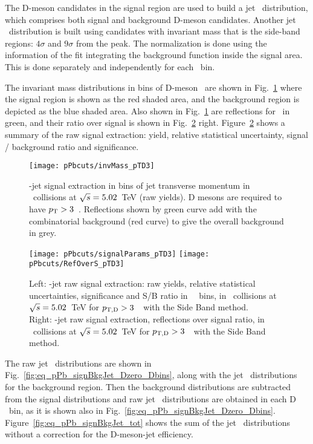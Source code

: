 The D-meson candidates in the signal region are used to build a jet \pt\ distribution, which comprises both signal and background D-meson candidates.
Another jet \pt\ distribution is built using candidates with invariant mass that is the side-band regions: $4\sigma$ and $9\sigma$ from the peak.
The normalization is done using the information of the fit integrating the background function inside the signal area. This is done separately and independently for each \ptd\ bin.


The invariant mass distributions in bins of D-meson \pt\ are shown in Fig.~\ref{fig:eq_pPb_InvMass_Dzero_Dbins} where  the signal region is shown as the red shaded area, and the background region is depicted as the blue shaded area.
Also shown in Fig.~\ref{fig:eq_pPb_InvMass_Dzero_Dbins} are reflections for \Dzero\ in green, and their ratio over signal is shown in Fig.~\ref{fig:eq_pPb_RSU_raw_Dbins_Dzero} right.
Figure~\ref{fig:eq_pPb_RSU_raw_Dbins_Dzero} shows a summary of the raw signal extraction:
yield, relative statistical uncertainty, signal / background ratio and significance.

\begin{figure}[bth]
\centering
\texttt{[image: pPbcuts/invMass\_pTD3]}
\caption{\Dzero-jet signal extraction in bins of jet transverse momentum in \pp\ collisions at $\sqrt{s}=5.02$~TeV (raw yields). D mesons are required to have $p_{\rm T}>3$~\GeVc. 
Reflections shown by green curve add with the combinatorial background (red curve) to give the overall background in grey.
}
\label{fig:eq_pPb_InvMass_Dzero_Dbins}
\end{figure}

\begin{figure}[bth]
\centering
\texttt{[image: pPbcuts/signalParams\_pTD3]}
\texttt{[image: pPbcuts/RefOverS\_pTD3]}
\caption{Left: \Dzero-jet raw signal extraction: raw yields, relative statistical uncertainties, significance and S/B ratio in \Dzero\ \pt\ bins, in \pp\ collisions at $\sqrt{s}=5.02$~TeV for $p_{\mathrm{T,D}}>3$~\GeVc\ with the Side Band method.
\\Right: \Dzero-jet raw signal extraction, reflections over signal ratio, in \pp\ collisions at $\sqrt{s}=5.02$~TeV for $p_{\mathrm{T,D}}>3$~\GeVc\ with the Side Band method.}
\label{fig:eq_pPb_RSU_raw_Dbins_Dzero}
\end{figure}

The raw jet \pt\ distributions are shown in Fig.~\ref{fig:eq_pPb_signBkgJet_Dzero_Dbins}, along with the jet \pt\ distributions for the background region. 
Then the background distributions are subtracted from the signal distributions and raw jet \pt\ distributions are obtained in each D \pt\ bin, 
as it is shown also in Fig.~\ref{fig:eq_pPb_signBkgJet_Dzero_Dbins}.
Figure~\ref{fig:eq_pPb_signBkgJet_tot} shows the sum of the jet \pt\ distributions without a correction for the D-meson-jet efficiency.

